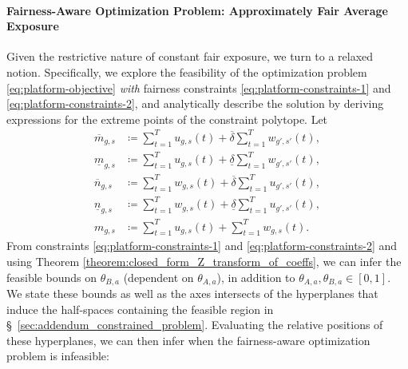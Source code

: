 \documentclass[letterpaper]{article} %
\begin{document}
\paragraph{Fairness-Aware Optimization Problem: Approximately Fair Average Exposure}
Given the restrictive nature of constant fair exposure, we  turn to a relaxed notion.
Specifically, we explore the feasibility of the optimization problem \eqref{eq:platform-objective} \emph{with} fairness constraints \eqref{eq:platform-constraints-1} and \eqref{eq:platform-constraints-2}, and analytically describe the solution by deriving expressions for the extreme points of the constraint polytope.
Let
\footnotesize
\begin{align*}
    \overline{m}_{g,s} &\coloneqq \sum_{t=1}^T u_{g,s}(t) + \overline{\delta}\sum_{t=1}^T w_{g',s'}(t), \\
    \underline{m}_{g,s} &\coloneqq \sum_{t=1}^T u_{g,s}(t) + \underline{\delta}\sum_{t=1}^T w_{g',s'}(t), \\
    \overline{n}_{g,s} &\coloneqq \sum_{t=1}^T w_{g,s}(t) + \overline{\delta}\sum_{t=1}^T u_{g',s'}(t), \\
    \underline{n}_{g,s} &\coloneqq \sum_{t=1}^T w_{g,s}(t) + \underline{\delta}\sum_{t=1}^T u_{g',s'}(t), \\
    m_{g,s} &\coloneqq \sum_{t=1}^T u_{g,s}(t) + \sum_{t=1}^T w_{g,s}(t).
\end{align*}
\normalsize
From constraints \eqref{eq:platform-constraints-1} and \eqref{eq:platform-constraints-2} and using Theorem \ref{theorem:closed_form_Z_transform_of_coeffs}, we can infer the feasible bounds on $\theta_{B,a}$ (dependent on $\theta_{A,a}$), in addition to $\theta_{A,a}, \theta_{B,a} \in [0,1]$.
We state these bounds as well as the axes intersects of the hyperplanes that induce the half-spaces containing the feasible region in \S~\ref{sec:addendum_constrained_problem}.
Evaluating the relative positions of these hyperplanes, we can then infer when the fairness-aware optimization problem is infeasible:
\end{document}
